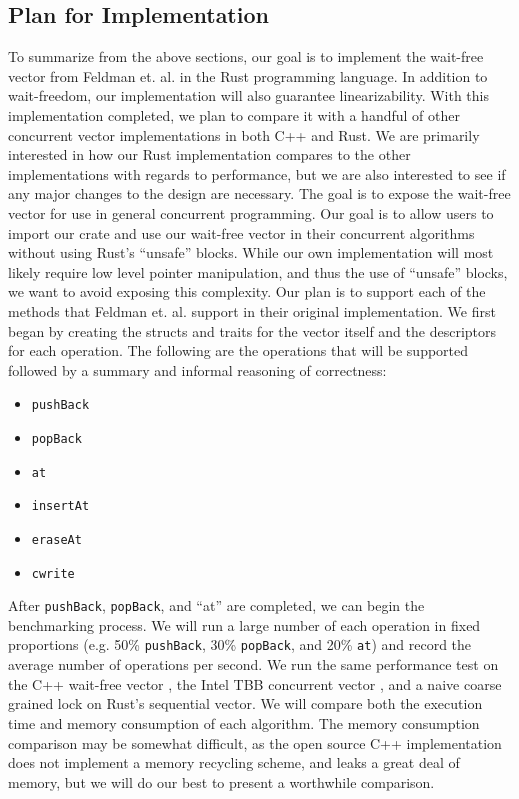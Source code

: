 \documentclass[conference]{IEEEtran}
\begin{document}
\subsection{Plan for Implementation}
To summarize from the above sections, our goal is to implement the wait-free vector from Feldman et. al. \cite{main} in the Rust programming language. In addition to wait-freedom, our implementation will also guarantee linearizability. With this implementation completed, we plan to compare it with a handful of other concurrent vector implementations in both C++ and Rust. We are primarily interested in how our Rust implementation compares to the other implementations with regards to performance, but we are also interested to see if any major changes to the design are necessary.
The goal is to expose the wait-free vector for use in general concurrent programming. Our goal is to allow users to import our crate and use our wait-free vector in their concurrent algorithms without using Rust’s “unsafe” blocks. While our own implementation will most likely require low level pointer manipulation, and thus the use of “unsafe” blocks, we want to avoid exposing this complexity.
Our plan is to support each of the methods that Feldman et. al. support in their original implementation. We first began by creating the structs and traits for the vector itself and the descriptors for each operation. The following are the operations that will be supported followed by a summary and informal reasoning of correctness:
    \begin{itemize}
        \item \verb|pushBack|
        \item \verb|popBack|
        \item \verb|at|
        \item \verb|insertAt|
        \item \verb|eraseAt|
        \item \verb|cwrite|
    \end{itemize}
    
After \verb|pushBack|, \verb|popBack|, and “at” are completed, we can begin the benchmarking process. We will run a large number of each operation in fixed proportions (e.g. 50\% \verb|pushBack|, 30\% \verb|popBack|, and 20\% \verb|at|) and record the average number of operations per second. We run the same performance test on the C++ wait-free vector \cite{cpp, main}, the Intel TBB concurrent vector \cite{tbb}, and a naive coarse grained lock on Rust’s sequential vector. We will compare both the execution time and memory consumption of each algorithm. The memory consumption comparison may be somewhat difficult, as the open source C++ implementation does not implement a memory recycling scheme, and leaks a great deal of memory, but we will do our best to present a worthwhile comparison.
\end{document}
